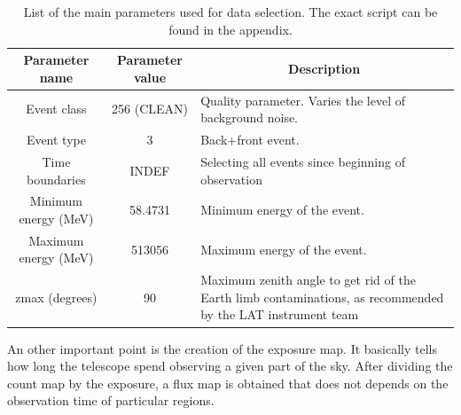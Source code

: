 \begin{center}
\begin{table}[h]
\centering
\begin{tabular}{|c|c|p{6.5cm}|}
\hline
\multicolumn{1}{|c|}{\textbf{Parameter name}} & \textbf{Parameter value} & \multicolumn{1}{c|}{\textbf{Description}}                                                                   \\ \hline
Event class                         & 256 (CLEAN)              & Quality parameter. Varies the level of background noise.                                                    \\ \hline
Event type                          & 3                        & Back+front event.                                                                                           \\ \hline
Time boundaries                     & INDEF                    & Selecting all events since beginning of observation                                                         \\ \hline
Minimum energy (MeV)                & 58.4731                  & Minimum energy of the event.                                                                                \\ \hline
Maximum energy (MeV)                & 513056                   & Maximum energy of the event.                                                                                \\ \hline
zmax (degrees)                      & 90                       & Maximum zenith angle to get rid of the Earth limb contaminations, as recommended by the LAT instrument team \\ \hline
\end{tabular}
\caption{List of the main parameters used for data selection. The exact script can be found in the appendix.}
\label{tab:fermi_selection_parameters}
\end{table}
\end{center}


An other important point is the creation of the exposure map. It basically tells how long the telescope spend observing a given part of the sky. After dividing the count map by the exposure, a flux map is obtained that does not depends on the observation time of particular regions. 


